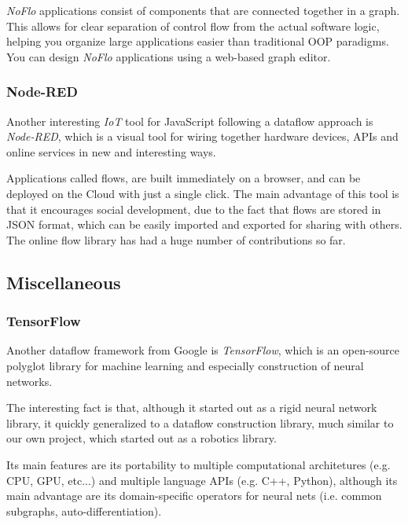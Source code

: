 \documentclass[sigplan,review,anonymous]{acmart}
\begin{document}
\textit{NoFlo} applications consist of components that are connected together in
a graph. This allows for clear separation of control flow from the actual
software logic, helping you organize large applications easier than traditional
OOP paradigms. You can design \textit{NoFlo} applications using a web-based
graph editor.

\subsubsection{Node-RED}

Another interesting \textit{IoT} tool for JavaScript following a dataflow
approach is \textit{Node-RED}\cite{node-red}, which is a visual tool for wiring
together hardware devices, APIs and online services in new and interesting ways.

Applications called flows, are built immediately on a browser, and can be
deployed on the Cloud with just a single click. The main advantage of this tool
is that it encourages social development, due to the fact that flows are stored
in JSON format, which can be easily imported and exported for sharing with
others. The online flow library has had a huge
number of contributions so far.

\subsection{Miscellaneous}

\subsubsection{TensorFlow}

Another dataflow framework from Google is
\textit{TensorFlow}, which is an open-source
polyglot library for machine learning and especially construction of neural
networks.

The interesting fact is that, although it started out as a rigid neural network
library, it quickly generalized to a dataflow construction library, much similar
to our own project, which started out as a robotics library.

Its main features are its portability to multiple computational architetures
(e.g. CPU, GPU, etc...) and multiple language APIs (e.g. C++, Python), although
its main advantage are its domain-specific operators for neural nets (i.e.
common subgraphs, auto-differentiation).
\end{document}
